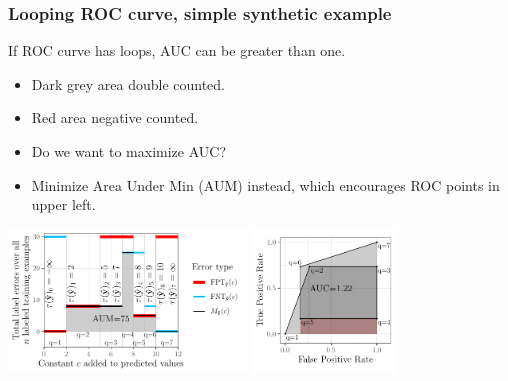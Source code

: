 \documentclass{beamer}
\begin{document}
\begin{frame}
  \frametitle{Looping ROC curve, simple synthetic example}

If ROC curve has loops, AUC can be greater than one.

  \begin{itemize}
  \item Dark grey area double counted.
  \item Red area negative counted.
  \item Do we want to maximize AUC?
  \item Minimize Area Under Min (AUM) instead, which encourages ROC
    points in upper left.
  \end{itemize}

  \includegraphics[height=1.5in]{figure-more-than-one-more-aum}
  \includegraphics[height=1.5in]{figure-more-than-one-more-auc}

\end{frame}
\end{document}
